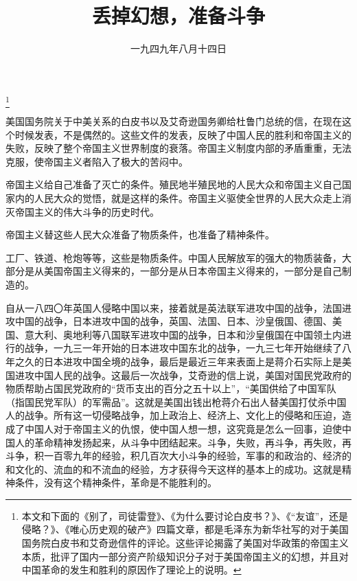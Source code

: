 
\title{丢掉幻想，准备斗争}
\date{一九四九年八月十四日}
\thanks{本文和下面的《别了，司徒雷登》、《为什么要讨论白皮书？》、《“友谊”，还是侵略？》、《唯心历史观的破产》四篇文章，都是毛泽东为新华社写的对于美国国务院白皮书和艾奇逊信件的评论。这些评论揭露了美国对华政策的帝国主义本质，批评了国内一部分资产阶级知识分子对于美国帝国主义的幻想，并且对中国革命的发生和胜利的原因作了理论上的说明。}
\maketitle


美国国务院关于中美关系的白皮书以及艾奇逊国务卿给杜鲁门总统的信，在现在这个时候发表，不是偶然的。这些文件的发表，反映了中国人民的胜利和帝国主义的失败，反映了整个帝国主义世界制度的衰落。帝国主义制度内部的矛盾重重，无法克服，使帝国主义者陷入了极大的苦闷中。

帝国主义给自己准备了灭亡的条件。殖民地半殖民地的人民大众和帝国主义自己国家内的人民大众的觉悟，就是这样的条件。帝国主义驱使全世界的人民大众走上消灭帝国主义的伟大斗争的历史时代。

帝国主义替这些人民大众准备了物质条件，也准备了精神条件。

工厂、铁道、枪炮等等，这些是物质条件。中国人民解放军的强大的物质装备，大部分是从美国帝国主义得来的，一部分是从日本帝国主义得来的，一部分是自己制造的。

自从一八四〇年英国人侵略中国以来，接着就是英法联军进攻中国的战争，法国进攻中国的战争，日本进攻中国的战争，英国、法国、日本、沙皇俄国、德国、美国、意大利、奥地利等八国联军进攻中国的战争，日本和沙皇俄国在中国领土内进行的战争，一九三一年开始的日本进攻中国东北的战争，一九三七年开始继续了八年之久的日本进攻中国全境的战争，最后是最近三年来表面上是蒋介石实际上是美国进攻中国人民的战争。这最后一次战争，艾奇逊的信上说，美国对国民党政府的物质帮助占国民党政府的“货币支出的百分之五十以上”，“美国供给了中国军队（指国民党军队）的军需品”。这就是美国出钱出枪蒋介石出人替美国打仗杀中国人的战争。所有这一切侵略战争，加上政治上、经济上、文化上的侵略和压迫，造成了中国人对于帝国主义的仇恨，使中国人想一想，这究竟是怎么一回事，迫使中国人的革命精神发扬起来，从斗争中团结起来。斗争，失败，再斗争，再失败，再斗争，积一百零九年的经验，积几百次大小斗争的经验，军事的和政治的、经济的和文化的、流血的和不流血的经验，方才获得今天这样的基本上的成功。这就是精神条件，没有这个精神条件，革命是不能胜利的。

